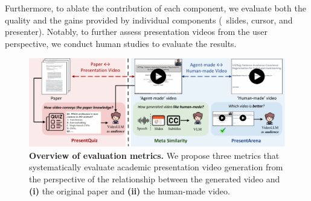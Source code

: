 \vspace{-0.3\baselineskip}
\noindent Furthermore, to ablate the contribution of each component, we evaluate both the quality and the gains provided by individual components (\eg~slides, cursor, and presenter). Notably, to further assess presentation videos from the user perspective, we conduct human studies to evaluate the results.

\begin{figure}[t]
    \centering
    \includegraphics[width=1\linewidth]{figure/eval.pdf}
    \caption{\textbf{Overview of evaluation metrics.} We propose three metrics that systematically evaluate academic presentation video generation from the perspective of the relationship between the generated video and \textbf{(i)} the original paper and \textbf{(ii)} the human-made video.}
    \label{fig:eval}
    \vspace{-0.2\baselineskip}
\end{figure}


